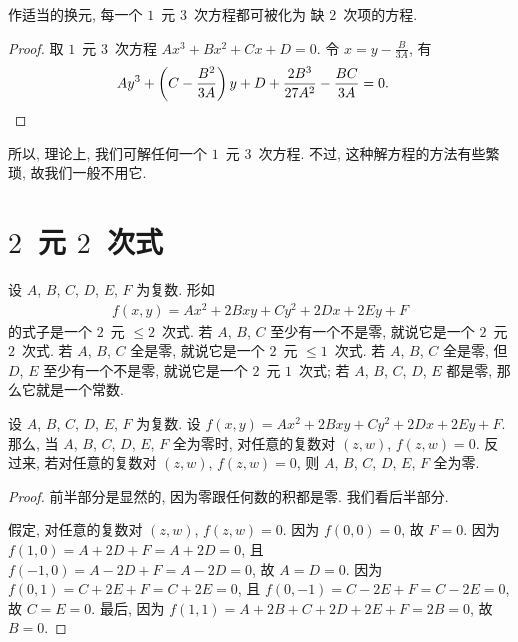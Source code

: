 \documentclass[%
    UTF8,%
    fontset=none,%
    punct=kaiming,%
    zihao=-4,%
    a4paper,%
    oneside,%
]{ctexbook}
\renewcommand*{\leq}{\leqslant}
\begin{document}
\begin{theorem}
    作适当的换元,
    每一个 \(1\)~元 \(3\)~次方程都可被化为%
    缺 \(2\)~次项的方程.
\end{theorem}

\begin{proof}
    取 \(1\)~元 \(3\)~次方程 \(Ax^3 + Bx^2 + Cx + D = 0\).
    令 \(x = y - \frac{B}{3A}\), 有
    \begin{align*}
         &
        Ay^3 + \left(C - \frac{B^2}{3A} \right)y
        + D + \frac{2B^3}{27A^2} - \frac{BC}{3A} = 0.
        \qedhere
    \end{align*}
\end{proof}

所以, 理论上, 我们可解任何一个 \(1\)~元 \(3\)~次方程.
不过, 这种解方程的方法有些繁琐,
故我们一般不用它.

\section{\texorpdfstring{\(2\)~元 \(2\)~次式}{2 元 2 次式}}

设 \(A\), \(B\), \(C\), \(D\), \(E\), \(F\) 为复数.
形如
\begin{align*}
    f(x, y) = Ax^2 + 2Bxy + Cy^2 + 2Dx + 2Ey + F
\end{align*}
的式子是一个 \(2\)~元 \({\leq} 2\)~次式.
若 \(A\), \(B\), \(C\) 至少有一个不是零,
就说它是一个 \(2\)~元 \(2\)~次式.
若 \(A\), \(B\), \(C\) 全是零,
就说它是一个 \(2\)~元 \({\leq} 1\)~次式.
若 \(A\), \(B\), \(C\) 全是零,
但 \(D\), \(E\) 至少有一个不是零,
就说它是一个 \(2\)~元 \(1\)~次式;
若 \(A\), \(B\), \(C\), \(D\), \(E\) 都是零,
那么它就是一个常数.

\begin{theorem}
    设 \(A\), \(B\), \(C\), \(D\), \(E\), \(F\) 为复数.
    设 \(f(x, y) = Ax^2 + 2Bxy + Cy^2 + 2Dx + 2Ey + F\).
    那么, 当 \(A\), \(B\), \(C\), \(D\), \(E\), \(F\)
    全为零时,
    对任意的复数对 \((z, w)\),
    \(f(z, w) = 0\).
    反过来, 若对任意的复数对 \((z, w)\),
    \(f(z, w) = 0\),
    则 \(A\), \(B\), \(C\), \(D\), \(E\), \(F\)
    全为零.
\end{theorem}

\begin{proof}
    前半部分是显然的, 因为零跟任何数的积都是零.
    我们看后半部分.

    假定, 对任意的复数对 \((z, w)\), \(f(z, w) = 0\).
    因为 \(f(0, 0) = 0\), 故 \(F = 0\).
    因为 \(f(1, 0) = A + 2D + F = A + 2D = 0\),
    且 \(f(-1, 0) = A - 2D + F = A - 2D = 0\),
    故 \(A = D = 0\).
    因为 \(f(0, 1) = C + 2E + F = C + 2E = 0\),
    且 \(f(0, -1) = C - 2E + F = C - 2E = 0\),
    故 \(C = E = 0\).
    最后, 因为
    \(f(1, 1) = A + 2B + C + 2D + 2E + F = 2B = 0\),
    故 \(B = 0\).
\end{proof}
\end{document}
